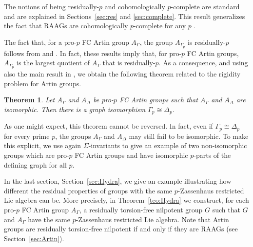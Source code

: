 \documentclass[10pt, oneside]{amsart}
\theoremstyle{definition}
\theoremstyle{remark}
\theoremstyle{plain}
\newtheorem{teoInt}{Theorem}
\begin{document}
The notions of being residually-$p$ and cohomologically $p$-complete are standard and are explained in Sections~\ref{sec:res} and \ref{sec:complete}. This result generalizes the fact that RAAGs are cohomologically $p$-complete for any $p$ \cite[Theorem 2.6]{L}.

The fact that, for a pro-$p$ FC Artin group $A_\Gamma$, the group $A_{\Gamma_p}$ is residually-$p$ follows from  \cite{Moldavanskii} and \cite{BS}. In fact, these results imply that, for pro-$p$ FC Artin groups, $A_{\Gamma_p}$ is the largest quotient of $A_\Gamma$ that is residually-$p$. As a consequence, and using also the main result in \cite{BlascoParis}, we obtain the following theorem related to the rigidity problem for Artin groups.

\begin{teoInt}\label{teo:isoproblem}
{\sl Let $A_{\Gamma}$ and $A_\Delta$ be pro-$p$ FC Artin groups such that $A_{\Gamma}$ and $A_\Delta$ are isomorphic. Then there is a graph isomorphism $\Gamma_p \cong \Delta_p$.}
\end{teoInt}

As one might expect, this theorem cannot be reversed. In fact, even if $\Gamma_p \cong \Delta_p$ for every prime $p$, the groups $A_\Gamma$ and $A_\Delta$ may still fail to be isomorphic. To make this explicit, we use again $\Sigma$-invariants to give an example of two non-isomorphic groups which are pro-$p$ FC Artin groups and have isomorphic $p$-parts of the defining graph for all $p$.




In the last section, Section~\ref{sec:Hydra}, we give an example illustrating how different the residual properties of groups with the same $p$-Zassenhaus restricted Lie algebra can be. More precisely, in Theorem~\ref{teo:Hydra} we construct, for each pro-$p$ FC Artin group $A_\Gamma$, a residually torsion-free nilpotent group $G$ such that $G$ and $A_\Gamma$ have the same $p$-Zassenhaus restricted Lie algebra. Note that Artin groups are residually torsion-free nilpotent if and only if they are RAAGs (see Section~\ref{sec:Artin}).
\end{document}
